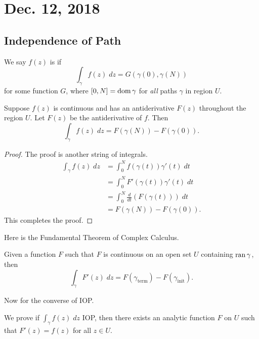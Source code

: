 \section{Dec. 12, 2018}

\subsection{Independence of Path}

We say $f(z)$ is  if
\[ \int_{\gamma} f(z) \; dz = G(\gamma(0), \gamma(N)) \]
for some function $G$, where $[0,N] = \operatorname{dom}{\gamma}$ for 
\textit{all} paths $\gamma$ in region $U$.

\begin{theorem}
    Suppose $f(z)$ is continuous and has an antiderivative $F(z)$ throughout the region $U$.
    Let $F(z)$ be the antiderivative of $f$.
    Then
    \[ \int_{\gamma} f(z) \; dz = F(\gamma(N)) - F(\gamma(0)). \]
\end{theorem}

\begin{proof}
    The proof is another string of integrals.
    \begin{align*}
        \int_{\gamma} f(z) \; dz &= \int_0^N f(\gamma(t)) \gamma'(t) \; dt \\
        &= \int_0^N F'(\gamma(t)) \gamma'(t) \; dt \\
        &= \int_0^N \frac{d}{dt} (F(\gamma(t))) \; dt \\
        &= F(\gamma(N)) - F(\gamma(0)).
    \end{align*}
    This completes the proof.
\end{proof}

Here is the Fundamental Theorem of Complex Calculus.
\begin{theorem}
    Given a function $F$ such that $F$ is continuous on an open
    set $U$ containing $\operatorname{ran}{\gamma}$, then
    \[ \int_{\gamma} F'(z) \; dz = F(\gamma_{\text{term}}) -
    F(\gamma_{\text{init}}). \]
\end{theorem}

Now for the converse of IOP.
\begin{theorem}
    We prove if $\int_{\gamma} f(z) \; dz$ IOP, then there exists
    an analytic function $F$ on $U$ such that $F'(z) = f(z)$ for
    all $z \in U$.
\end{theorem}

